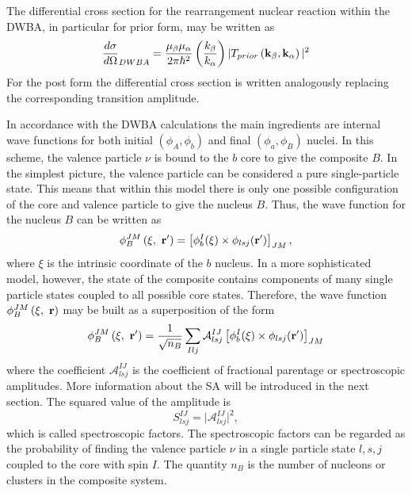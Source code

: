 \documentclass[
12pt, %
oneside, %
english, %
doublespacing, %
doublespacing, %
toctotoc, %
parskip, %
headsepline, %
]{MastersDoctoralThesis} %
\begin{document}
 The differential cross section for the rearrangement nuclear reaction within the DWBA, in particular for prior form, may be written as
 \begin{equation}
 \frac{d \sigma}{d \Omega}_{DWBA} = \frac{\mu_\beta \mu_\alpha}{2 \pi \hbar^2}
 \left( \frac{k_\beta}{k_\alpha}\right)
 \vert T_{prior} \left( {\bf k}_\beta, {\bf k}_\alpha \right) \vert^2
 \end{equation}
 For the post form the differential cross section is written analogously replacing the corresponding transition amplitude.
 
 In accordance with the DWBA calculations the main ingredients are internal wave functions for both initial $\left( \phi_A, \phi_b \right)$ and final $\left( \phi_a, \phi_B \right)$ nuclei. 
 In this scheme, the valence particle $\nu$ is bound to the $b$ core to give the composite $B$.
In the simplest picture, the valence particle can be considered a pure single-particle state. 
This means that within this model there is only one possible configuration of the core and valence particle to give the nucleus $B$. Thus, the wave function for the nucleus $B$ can be written as
\begin{equation}
\phi^{JM}_B \left( \xi,~{\bf r}' \right) = 
\left[ \phi_b^I (\xi)  \times \phi_{lsj} ({\bf r}') \right]_{JM},
\end{equation}
where $\xi$ is the intrinsic coordinate of the $b$ nucleus.  In a more sophisticated model, however, the state of the composite contains components of many single particle states coupled to all possible core states.
 Therefore, the wave function $\phi^{JM}_B \left( \xi,~{\bf r} \right) $ may be built as a superposition of the form
 \begin{equation}
 \phi^{JM}_B \left( \xi,~{\bf r}' \right)  =
 \frac{1}{\sqrt{n_B}}
 \sum_{Ilj} \mathcal{A}_{lsj}^{IJ} 
 \left[ \phi_b^I (\xi)  \times \phi_{lsj} ({\bf r}') \right]_{JM}
 \label{eq:composite_expansion}
 \end{equation}
 where the coefficient $\mathcal{A}_{lsj}^{IJ} $ is  the coefficient of fractional parentage or spectroscopic amplitudes. 
 More information about the SA will be introduced in the next section. 
  The squared value of the amplitude is
 \begin{equation}
 S^{IJ}_{lsj} = \vert \mathcal{A}_{lsj}^{IJ}  \vert^2,
 \end{equation}
 which is called spectroscopic factors. 
 The spectroscopic factors can be regarded as the probability of finding the valence particle $\nu$ in a single particle state $l, s, j$ coupled to the core with spin $I$.
 The quantity $n_B$ is the number of nucleons or clusters in the composite system. 
 
\end{document}
